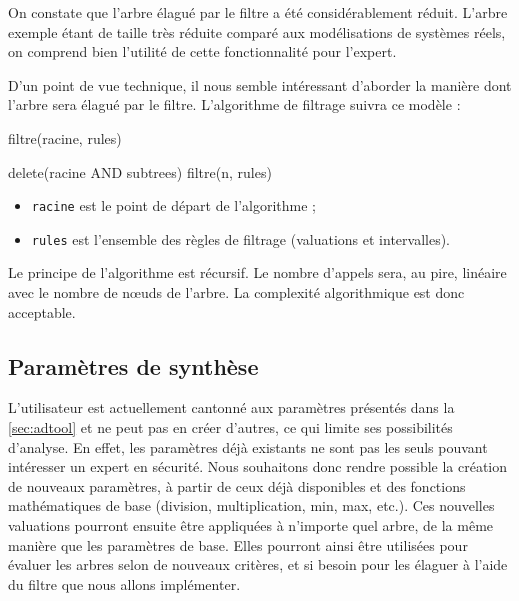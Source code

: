 		On constate que l'arbre élagué par le filtre a été considérablement réduit. L'arbre exemple étant de taille très réduite comparé aux modélisations de systèmes réels, on comprend bien l'utilité de cette fonctionnalité pour l'expert.

		D'un point de vue technique, il nous semble intéressant d'aborder la manière dont l'arbre sera élagué par le filtre. L'algorithme de filtrage suivra ce modèle :

		\begin{algorithm}[h!]
			\caption{filtre(racine, rules)}
			\begin{algorithmic}
						\STATE delete(racine AND subtrees)
						\RETURN
					\ENDIF
				\ENDFOR
					\STATE filtre(n, rules)
				\ENDFOR
			\end{algorithmic}
		\end{algorithm}

		\begin{itemize}
			\item \verb|racine| est le point de départ de l'algorithme ;
			\item \verb|rules| est l'ensemble des règles de filtrage (valuations et intervalles).
		\end{itemize}
	
		Le principe de l'algorithme est récursif. Le nombre d'appels sera, au pire, linéaire avec le nombre de nœuds de l'arbre. La complexité algorithmique est donc acceptable.

		\subsection{Paramètres de synthèse}
			\label{subsection:synthese} 

			L'utilisateur est actuellement cantonné aux paramètres présentés dans la {} \ref{sec:adtool} et ne peut pas en créer d'autres, ce qui limite ses possibilités d'analyse. En effet, les paramètres déjà existants ne sont pas les seuls pouvant intéresser un expert en sécurité. Nous souhaitons donc rendre possible la création de nouveaux paramètres, à partir de ceux déjà disponibles et des fonctions mathématiques de base (division, multiplication, min, max, etc.). Ces nouvelles valuations pourront ensuite être appliquées à n'importe quel arbre, de la même manière que les paramètres de base. Elles pourront ainsi être utilisées pour évaluer les arbres selon de nouveaux critères, et si besoin pour les élaguer à l'aide du filtre que nous allons implémenter.

